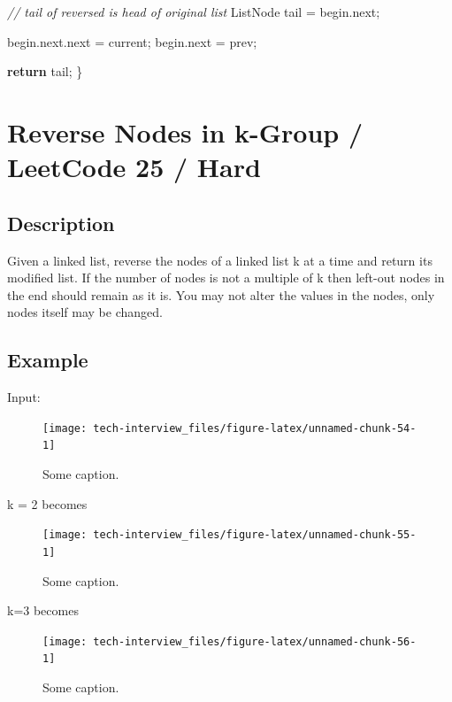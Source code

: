 \documentclass[]{book}
\newenvironment{Shaded}{\begin{snugshade}}{\end{snugshade}}
\newcommand{\CommentTok}[1]{\textcolor[rgb]{0.56,0.35,0.01}{\textit{#1}}}
\newcommand{\FunctionTok}[1]{\textcolor[rgb]{0.00,0.00,0.00}{#1}}
\newcommand{\KeywordTok}[1]{\textcolor[rgb]{0.13,0.29,0.53}{\textbf{#1}}}
\newcommand{\NormalTok}[1]{#1}
\begin{document}
\begin{Shaded}
\begin{Highlighting}[]
    \CommentTok{// tail of reversed is head of original list}
\NormalTok{    ListNode tail = begin.}\FunctionTok{next}\NormalTok{;}

\NormalTok{    begin.}\FunctionTok{next}\NormalTok{.}\FunctionTok{next}\NormalTok{ = current;}
\NormalTok{    begin.}\FunctionTok{next}\NormalTok{ = prev;}

    \KeywordTok{return}\NormalTok{ tail;}
\NormalTok{\}}
\end{Highlighting}
\end{Shaded}

\hypertarget{reverse-nodes-in-k-group-leetcode-25-hard}{%
\section{Reverse Nodes in k-Group / LeetCode 25 / Hard}\label{reverse-nodes-in-k-group-leetcode-25-hard}}

\hypertarget{description-89}{%
\subsection{Description}\label{description-89}}

Given a linked list, reverse the nodes of a linked list k at a time and return its modified list. If the number of
nodes is not a multiple of k then left-out nodes in the end should remain as it is. You may not alter the values in
the nodes, only nodes itself may be changed.

\hypertarget{example-85}{%
\subsection{Example}\label{example-85}}

Input:

\begin{figure}
\texttt{[image: tech-interview\_files/figure-latex/unnamed-chunk-54-1]} \caption{Some caption.}\label{fig:unnamed-chunk-54}
\end{figure}

k = 2 becomes

\begin{figure}
\texttt{[image: tech-interview\_files/figure-latex/unnamed-chunk-55-1]} \caption{Some caption.}\label{fig:unnamed-chunk-55}
\end{figure}

k=3 becomes

\begin{figure}
\texttt{[image: tech-interview\_files/figure-latex/unnamed-chunk-56-1]} \caption{Some caption.}\label{fig:unnamed-chunk-56}
\end{figure}
\end{document}
